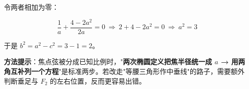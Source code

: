 \begin{answer}
令两者相加为零：

\nopagebreak[4]
\[\frac1a+\frac{4-2a^{2}}{2a}=0\ \Longrightarrow\ 2+4-2a^{2}=0\ \Longrightarrow\ a^{2}=3\]

于是 $b^{2}=a^{2}-c^{2}=3-1=2$。

\begin{gktip}
\textbf{方法提示}：焦点弦被分成已知比例时，"\textbf{两次椭圆定义把焦半径统一成 $a$ → 用两角互补列一个方程}"是标准两步。若改走"等腰三角形作中垂线"的路子，需要额外判断垂足与 $F_2$ 的左右位置，反而更容易出错。
\end{gktip}

\enlargethispage{2cm}


\par\medskip

\end{answer}

